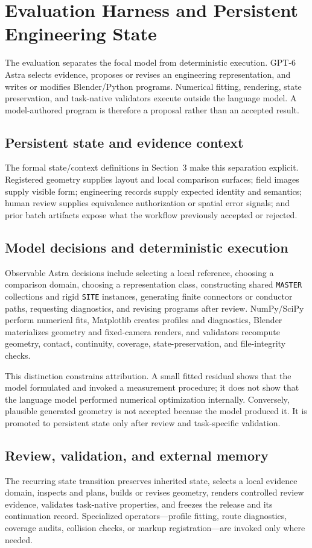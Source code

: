 \documentclass[10pt]{article}
\begin{document}
\section{Evaluation Harness and Persistent Engineering State}
The evaluation separates the focal model from deterministic execution. GPT-6 Astra selects evidence, proposes or revises an engineering representation, and writes or modifies Blender/Python programs. Numerical fitting, rendering, state preservation, and task-native validators execute outside the language model. A model-authored program is therefore a proposal rather than an accepted result.

\subsection{Persistent state and evidence context}
The formal state/context definitions in Section~3 make this separation explicit. Registered geometry supplies layout and local comparison surfaces; field images supply visible form; engineering records supply expected identity and semantics; human review supplies equivalence authorization or spatial error signals; and prior batch artifacts expose what the workflow previously accepted or rejected.

\subsection{Model decisions and deterministic execution}
Observable Astra decisions include selecting a local reference, choosing a comparison domain, choosing a representation class, constructing shared \texttt{MASTER} collections and rigid \texttt{SITE} instances, generating finite connectors or conductor paths, requesting diagnostics, and revising programs after review. NumPy/SciPy perform numerical fits, Matplotlib creates profiles and diagnostics, Blender materializes geometry and fixed-camera renders, and validators recompute geometry, contact, continuity, coverage, state-preservation, and file-integrity checks.

This distinction constrains attribution. A small fitted residual shows that the model formulated and invoked a measurement procedure; it does not show that the language model performed numerical optimization internally. Conversely, plausible generated geometry is not accepted because the model produced it. It is promoted to persistent state only after review and task-specific validation.

\subsection{Review, validation, and external memory}
The recurring state transition preserves inherited state, selects a local evidence domain, inspects and plans, builds or revises geometry, renders controlled review evidence, validates task-native properties, and freezes the release and its continuation record. Specialized operators---profile fitting, route diagnostics, coverage audits, collision checks, or markup registration---are invoked only where needed.
\end{document}
